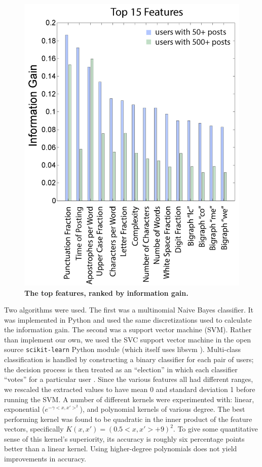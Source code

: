 \documentclass[12pt,letterpaper,onecolumn,oneside]{article}
\numberwithin{equation}{section}
\numberwithin{figure}{section}
\begin{document}
\begin{figure}[H]
 \centering
  \includegraphics[scale=0.4]{TopFeatures.png}
  \caption{\textbf{\footnotesize{The top features, ranked by information gain.}}}
  \label{infogain}
\end{figure}

Two algorithms were used. The first was a multinomial Naive Bayes classifier. It was implemented in Python and used the same discretizations used to calculate the information gain. The second was a support vector 
machine (SVM). Rather than implement our own, we used the SVC support vector machine in the open source \verb+scikit-learn+ \cite{scikit-learn} Python module (which itself uses libsvm \cite{libsvm}). 
Multi-class classification is handled by constructing a binary classifier for each pair of users; the decision process is then treated as an ``election'' in which each classifier ``votes'' for a particular user 
\cite{libsvm}. Since the various features all had different ranges, we rescaled the extracted values to have mean 0 and standard deviation 1 before running the SVM. A number of different kernels were experimented 
with: linear, exponential (\(e^{-\gamma <x,x'>^2}\)), and polynomial kernels of various degree. The best performing kernel was found to be quadratic in the inner product of the feature vectors, specifically 
\(K(x,x') = (0.5<x,x'>+9)^2\). To give some quantitative sense of this kernel's superiority, its accuracy is roughly six percentage points better than a linear kernel. Using higher-degree polynomials does not yield 
improvements in accuracy.
\end{document}
